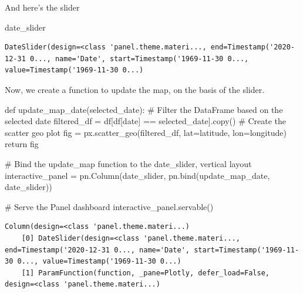 \documentclass[
  letterpaper,
  DIV=11,
  numbers=noendperiod]{scrreprt}
\newenvironment{Shaded}{\begin{snugshade}}{\end{snugshade}}
\newcommand{\CommentTok}[1]{\textcolor[rgb]{0.37,0.37,0.37}{#1}}
\newcommand{\ControlFlowTok}[1]{\textcolor[rgb]{0.00,0.23,0.31}{#1}}
\newcommand{\KeywordTok}[1]{\textcolor[rgb]{0.00,0.23,0.31}{#1}}
\newcommand{\NormalTok}[1]{\textcolor[rgb]{0.00,0.23,0.31}{#1}}
\newcommand{\OperatorTok}[1]{\textcolor[rgb]{0.37,0.37,0.37}{#1}}
\newcommand{\StringTok}[1]{\textcolor[rgb]{0.13,0.47,0.30}{#1}}
\begin{document}
And here's the slider

\begin{Shaded}
\begin{Highlighting}[]
\NormalTok{date\_slider}
\end{Highlighting}
\end{Shaded}

\begin{verbatim}
DateSlider(design=<class 'panel.theme.materi..., end=Timestamp('2020-12-31 0..., name='Date', start=Timestamp('1969-11-30 0..., value=Timestamp('1969-11-30 0...)
\end{verbatim}

Now, we create a function to update the map, on the basis of the slider.

\begin{Shaded}
\begin{Highlighting}[]
\KeywordTok{def}\NormalTok{ update\_map\_date(selected\_date):}
    \CommentTok{\# Filter the DataFrame based on the selected date}
\NormalTok{    filtered\_df }\OperatorTok{=}\NormalTok{ df[df[}\StringTok{\textquotesingle{}date\textquotesingle{}}\NormalTok{] }\OperatorTok{==}\NormalTok{ selected\_date].copy()}
    \CommentTok{\# Create the scatter geo plot}
\NormalTok{    fig }\OperatorTok{=}\NormalTok{ px.scatter\_geo(filtered\_df, lat}\OperatorTok{=}\StringTok{\textquotesingle{}latitude\textquotesingle{}}\NormalTok{, lon}\OperatorTok{=}\StringTok{\textquotesingle{}longitude\textquotesingle{}}\NormalTok{)}
    \ControlFlowTok{return}\NormalTok{ fig}
\end{Highlighting}
\end{Shaded}

\begin{Shaded}
\begin{Highlighting}[]
\CommentTok{\# Bind the update\_map function to the date\_slider, vertical layout}
\NormalTok{interactive\_panel }\OperatorTok{=}\NormalTok{ pn.Column(date\_slider, pn.bind(update\_map\_date, date\_slider))}

\CommentTok{\# Serve the Panel dashboard}
\NormalTok{interactive\_panel.servable()}
\end{Highlighting}
\end{Shaded}

\begin{verbatim}
Column(design=<class 'panel.theme.materi...)
    [0] DateSlider(design=<class 'panel.theme.materi..., end=Timestamp('2020-12-31 0..., name='Date', start=Timestamp('1969-11-30 0..., value=Timestamp('1969-11-30 0...)
    [1] ParamFunction(function, _pane=Plotly, defer_load=False, design=<class 'panel.theme.materi...)
\end{verbatim}
\end{document}

